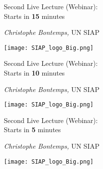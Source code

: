 \documentclass[xcolor=x11names,compress, aspectratio=169]{beamer}
\renewcommand{\(}{\begin{columns}}
\renewcommand{\)}{\end{columns}}
\newcommand{\<}[1]{\begin{column}{#1}}
\renewcommand{\>}{\end{column}}
\begin{document}
\begin{frame}
\Large{ \color{siap}{Machine Learning for Official Statistics and SDGs}}
\vspace{0.5cm}

{\huge\textcolor{brique}{Second Live Lecture (Webinar): \\
\vspace{0.2cm}
Starts in \textbf{15} minutes\\
}}

\vspace{0.5cm}
\begin{center}
\textcolor{siap}{\textit{Christophe Bontemps,} UN  SIAP\\ }
\vspace{1cm}

\texttt{[image: SIAP\_logo\_Big.png]}
\end{center}
\end{frame}

\begin{frame}
\Large{ \color{siap}{Machine Learning for Official Statistics and SDGs}}
\vspace{0.5cm}

{\huge\textcolor{brique}{Second Live Lecture (Webinar): \\
\vspace{0.2cm}
Starts in \textbf{10} minutes\\
}}

\vspace{0.5cm}
\begin{center}
\textcolor{siap}{\textit{Christophe Bontemps,} UN  SIAP\\ }
\vspace{1cm}

\texttt{[image: SIAP\_logo\_Big.png]}
\end{center}
\end{frame}

\begin{frame}
\Large{ \color{siap}{Machine Learning for Official Statistics and SDGs}}
\vspace{0.5cm}

{\huge\textcolor{brique}{Second Live Lecture (Webinar): \\
\vspace{0.2cm}
Starts in \textbf{5} minutes\\
}}

\vspace{0.5cm}
\begin{center}
\textcolor{siap}{\textit{Christophe Bontemps,} UN  SIAP\\ }
\vspace{1cm}

\texttt{[image: SIAP\_logo\_Big.png]}
\end{center}
\end{frame}
\end{document}
